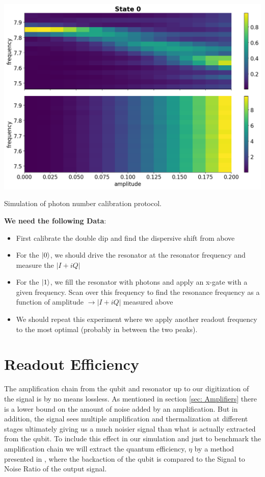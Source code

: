 \begin{marginfigure}[- 5 cm]
    \centering
    \includegraphics[width = 1.3 \textwidth]{tex/fig_for_text/section_6/photon_number_calibration.png}
    \caption{Simulation of photon number calibration protocol.  }
    \label{fig:photon_number_calibration}
\end{marginfigure}

\noindent
\textbf{We need the following Data}:
\begin{itemize}
    \item First calibrate the double dip and find the dispersive shift from above
    \item For the $\ket{0}$, we should drive the resonator at the resonator frequency and measure the $|I + iQ|$
    \item For the $\ket{1}$, we fill the resonator with photons and apply an x-gate with a given frequency. Scan over this frequency to find the resonance frequency as a function of amplitude $\to |I + iQ|$ measured above
    \item We should repeat this experiment where we apply another readout frequency to the most optimal (probably in between the two peaks). 
\end{itemize}

\section{Readout Efficiency}
The amplification chain from the qubit and resonator up to our digitization of the signal is by no means lossless. As mentioned in section \ref{sec: Amplifiers} there is a lower bound on the amount of noise added by an amplification. But in addition, the signal sees multiple amplification and thermalization at different stages ultimately giving us a much noisier signal than what is actually extracted from the qubit. To include this effect in our simulation and just to benchmark the amplification chain we will extract the quantum efficiency, $\eta$ by a method presented in \cite{bultink}, where the backaction of the qubit is compared to the Signal to Noise Ratio of the output signal. 

